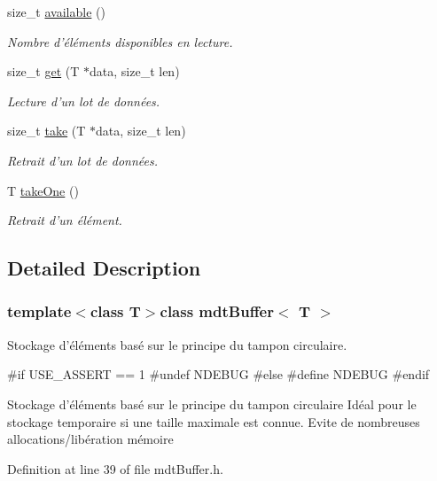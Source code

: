 \begin{DoxyCompactItemize}
size\_\-t \hyperlink{classmdt_buffer_a24ca1a2d00ba1623416ec747ba440adf}{available} ()
\begin{DoxyCompactList}\small\item\em Nombre d'éléments disponibles en lecture. \end{DoxyCompactList}\item 
size\_\-t \hyperlink{classmdt_buffer_a123a85c9cd59f80623aba5589709050e}{get} (T $\ast$data, size\_\-t len)
\begin{DoxyCompactList}\small\item\em Lecture d'un lot de données. \end{DoxyCompactList}\item 
size\_\-t \hyperlink{classmdt_buffer_ad4756dea3500741363092d5a85ef858e}{take} (T $\ast$data, size\_\-t len)
\begin{DoxyCompactList}\small\item\em Retrait d'un lot de données. \end{DoxyCompactList}\item 
T \hyperlink{classmdt_buffer_a690e3f41a62175de48bc73c19f69208d}{takeOne} ()
\begin{DoxyCompactList}\small\item\em Retrait d'un élément. \end{DoxyCompactList}\end{DoxyCompactItemize}


\subsection{Detailed Description}
\subsubsection*{template$<$class T$>$class mdtBuffer$<$ T $>$}

Stockage d'éléments basé sur le principe du tampon circulaire. 

\#if USE\_\-ASSERT == 1 \#undef NDEBUG \#else \#define NDEBUG \#endif

Stockage d'éléments basé sur le principe du tampon circulaire Idéal pour le stockage temporaire si une taille maximale est connue. Evite de nombreuses allocations/libération mémoire 

Definition at line 39 of file mdtBuffer.h.



